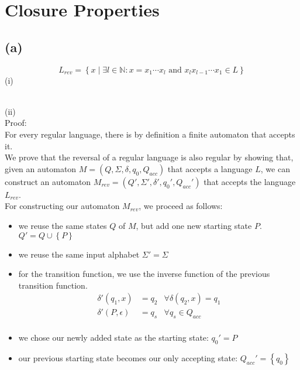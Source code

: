 



\setcounter{section}{2}
\section{Closure Properties}
\subsection{(a)}
$$L_{rev} = \left\{x\mid \exists l \in \mathbb{N}: x = x_{1}\cdots x_{l} \text{ and } x_{l}x_{l-1}\cdots x_{1} \in L\right\}$$
\noindent (i)\\
\\
\noindent (ii)\\
Proof:\\
For every regular language, there is by definition a finite automaton that accepts it.\\
We prove that the reversal of a regular language is also regular by showing that, given an automaton $M=(Q,\Sigma,\delta,q_{0},Q_{acc})$ that accepts a language $L$, we can construct an automaton $M_{rev}=(Q',\Sigma',\delta',q_{0}',Q_{acc}')$ that accepts the language $L_{rev}$.\\
For constructing our automaton $M_{rev}$, we proceed as follows:
\begin{itemize}
    \item we reuse the same states $Q$ of $M$, but add one new starting state $P$.\\
    $Q' = Q \cup \left\{P\right\}$
    \item we reuse the same input alphabet $\Sigma' = \Sigma$
    \item for the transition function, we use the inverse function of the previous transition function.\\
    \begin{align*}
        \delta'(q_{1}, x) &= q_{2}&\forall \delta(q_{2},x) = q_{1}\\
        \delta'(P, \epsilon) &= q_{s} &\forall q_{s}\in Q_{acc}\\
    \end{align*}
    \item we chose our newly added state as the starting state: $q_{0}' = P$
    \item our previous starting state becomes our only accepting state: $Q_{acc}' = \left\{q_{0}\right\}$
\end{itemize}
